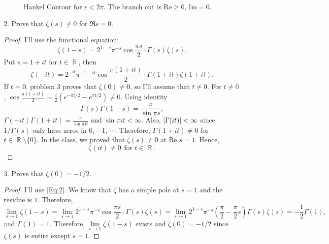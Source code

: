 \documentclass{article}
\DeclareMathOperator{\rr}{\mathbb{R}}
\begin{document}
\begin{enumerate}
\begin{figure}[h]
\caption{Hankel Contour for $\epsilon<2\pi$. The branch cut is $\text{Re}\geq0$, $\text{Im}=0$.}
\label{Fig:P1}
\end{figure}
\newpage
\item[2.] Prove that $\zeta(s)\neq 0$ for $\Re s=0$.
\begin{proof}
I'll use the functional equation:
\begin{equation}\label{Eq:2}
\zeta(1-s)=2^{1-s}\pi^{-s}\cos\frac{\pi s}{2}\cdot \Gamma(s)\zeta(s).
\end{equation}
Put $s=1+it$ for $t\in \rr$, then
\begin{equation*}
\zeta(-it)=2^{-it}\pi^{-1-it}\cos\frac{\pi (1+it)}{2}\cdot \Gamma(1+it)\zeta(1+it).
\end{equation*}
If $t=0$, problem 3 proves that $\zeta(0)\neq 0$, so I'll assume that $t\neq 0$.
For $t\neq 0$, $\cos\frac{\pi (1+it)}{2}=\frac{i}{2}\left(e^{-\pi t/2}-e^{\pi t/2}\right)\neq 0$. Using identity
\begin{equation*}
\Gamma(s)\Gamma(1-s)=\frac{\pi}{\sin \pi s},
\end{equation*}
$\Gamma(-it)\Gamma(1+it)=\frac{\pi}{\sin \pi i t}$ and $\sin \pi i t< \infty$. Also, $\abs{\Gamma(it)}<\infty$ since $1/\Gamma(s)$ only have zeros in $0$, $-1$, $\cdots$. Therefore, $\Gamma(1+it)\neq 0$ for $t\in \rr\setminus\{0\}$. In the class, we proved that $\zeta(s)\neq 0$ at $\text{Re }s=1$. Hence,
\begin{equation*}
\zeta(it)\neq 0~~\text{for }t\in\rr.
\end{equation*}
\end{proof}
\item[3.] Prove that $\zeta(0)=-1/2$.
\begin{proof}
I'll use \eqref{Eq:2}. We know that $\zeta$ has a simple pole at $s=1$ and the residue is $1$. Therefore,
\begin{equation*}
\lim\limits_{s\rightarrow 1} \zeta(1-s)=\lim\limits_{s\rightarrow 1}2^{1-s}\pi^{-s}\cos\frac{\pi s}{2}\cdot \Gamma(s)\zeta(s)=\lim\limits_{s\rightarrow 1} 2^{1-s}\pi^{-s}\left(\frac{\pi}{2}-\frac{\pi}{2}s\right)\Gamma(s)\zeta(s)=-\frac{1}{2}\Gamma(1),
\end{equation*}
and $\Gamma(1)=1$. Therefore, $\lim\limits_{s\rightarrow 1}\zeta(1-s)$ exists and $\zeta(0)=-1/2$ since $\zeta(s)$ is entire except $s=1$.
\end{proof}
\end{enumerate}
\end{document}
